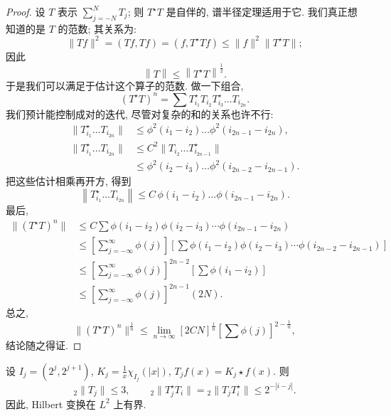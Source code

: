 \begin{proof}
设 $T$ 表示 $\sum_{j=-N}^{N}T_{j}$; 则 $T^{\star}T$ 是自伴的, 谱半径定理适用于它. 我们真正想知道的是 $T$ 的范数; 其关系为:
\[
\|T f\|^{2}=(T f,T f)=(f,T^{\star}T f)\leq\|f\|^{2}\|T^{\star}T\|;
\]
因此
\[
\left\|T\right\|\leq\left\|T^{\star}T\right\|^{\frac{1}{2}}.
\]
于是我们可以满足于估计这个算子的范数. 做一下组合,
\[
(T^{\star}T)^{n}=\sum T_{i_{1}}^{\star}T_{i_{2}}T_{i_{3}}^{\star}\ldots T_{i_{2n}}.
\]
我们预计能控制成对的迭代, 尽管对复杂的和的关系也许不行:
\begin{align*}
\|T_{i_{1}}^{\star}\ldots T_{i_{2n}}\|&\leq\phi^{2}(i_{1}-i_{2})\ldots\phi^{2}(i_{2n-1}-i_{2n}), \\
\|T_{i_{1}}^{\star}\ldots T_{i_{2n}}\|&\leq C^{2}\|T_{i_{2}}\ldots T_{i_{2n-1}}^{\star}\| \\
&\leq\phi^{2}(i_{2}-i_{3})\ldots\phi^{2}(i_{2n-2}-i_{2n-1}).
\end{align*}
把这些估计相乘再开方, 得到
\[
\left\|T_{i_{1}}^{\star}\ldots T_{i_{2n}}\right\|\leq C\,\phi(i_{1}-i_{2})\ldots\phi(i_{2n-1}-i_{2n}).
\]
最后,
\begin{align*}
\|(T^{\star}T)^{n}\|&\leq C\sum\phi(i_{1}-i_{2})\phi(i_{2}-i_{3})\cdots\phi(i_{2n-1}-i_{2n}) \\
&\leq\left[\sum_{j=-\infty}^{\infty}\phi(j)\right]\left[\sum\phi(i_{1}-i_{2})\phi(i_{2}-i_{3})\cdots\phi(i_{2n-2}-i_{2n-1})\right] \\
&\leq\left[\sum_{j=-\infty}^{\infty}\phi(j)\right]^{2n-2}\left[\sum\phi(i_{1}-i_{2})\right] \\
&\leq\left[\sum_{j=-\infty}^{\infty}\phi(j)\right]^{2n-1}(2N).
\end{align*}
总之,
\[
\|(T^{\star}T)^{n}\|^{\frac{1}{n}}\leq\lim_{n\to\infty}[2CN]^{\frac{1}{n}}\left[\sum\phi(j)\right]^{2-\frac{1}{n}},
\]
结论随之得证.
\end{proof}

\begin{theorem}\label{thm:2.19}
设 $I_j=(2^j,2^{j+1})$, $K_j=\frac{1}{x}\chi_{I_j}(|x|)$, $T_j f(x)=K_j\star f(x)$. 则
\[
{}_{2}\|T_{j}\|\leq 3,
\qquad
{}_{2}\|T_{j}^{\star}T_{i}\|={}_{2}\|T_{j}T_{i}^{\star}\|\leq 2^{-|i-j|}.
\]
因此, Hilbert 变换在 $L^{2}$ 上有界.
\end{theorem}

